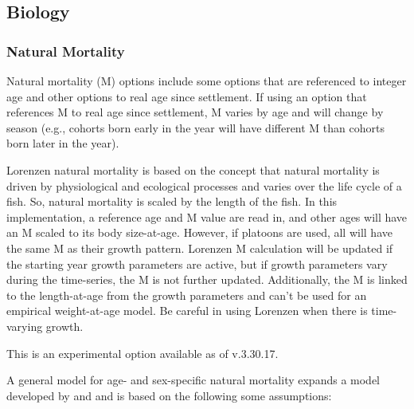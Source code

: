 \subsection{Biology}
\subsubsection{Natural Mortality}
Natural mortality (M) options include some options that are referenced to integer age and other options to real age since settlement. If using an option that references M to real age since settlement, M varies by age and will change by season (e.g., cohorts born early in the year will have different M than cohorts born later in the year).

Lorenzen natural mortality is based on the concept that natural mortality is driven by physiological and ecological processes and varies over the life cycle of a fish. So, natural mortality is scaled by the length of the fish. In this implementation, a reference age and M value are read in, and other ages will have an M scaled to its body size-at-age. However, if platoons are used, all will have the same M as their growth pattern. Lorenzen M calculation will be updated if the starting year growth parameters are active, but if growth parameters vary during the time-series, the M is not further updated. Additionally, the M is linked to the length-at-age from the growth parameters and can't be used for an empirical weight-at-age model. Be careful in using Lorenzen when there is time-varying growth.


This is an experimental option available as of v.3.30.17. 

A general model for age- and sex-specific natural mortality expands a model developed by \citet{maunder2010bigeye} and \citet{maunder2011M} and is based on the following some assumptions:

